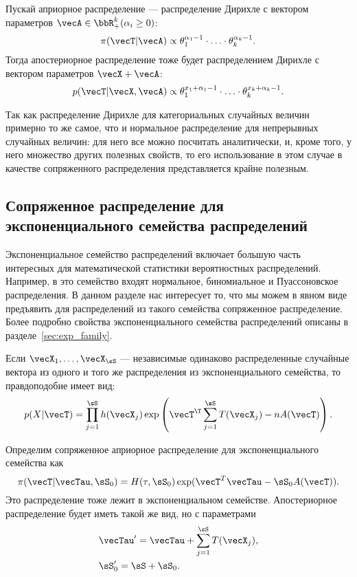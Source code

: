 Пускай априорное распределение --- распределение Дирихле с вектором параметров $\vecA \in \bbR_+^k (\alpha_i \geq 0)$:
\[
\pi(\vecT | \vecA) \propto \theta_1^{\alpha_1 - 1} \cdot \ldots \cdot \theta_k^{\alpha_k - 1}.
\]
Тогда апостериорное распределение тоже будет распределением Дирихле с вектором параметров $\vecX + \vecA$:
\[
p(\vecT | \vecX, \vecA) \propto \theta_1^{x_1 + \alpha_1 - 1} \cdot \ldots \cdot \theta_k^{x_k + \alpha_k - 1}.
\]

Так как распределение Дирихле для категориальных случайных величин примерно то же самое, что и нормальное распределение для непрерывных случайных величин: для него все можно посчитать аналитически, и, кроме того, у него множество других полезных свойств, то его использование в этом случае в 
качестве сопряженного распределения представляется крайне полезным.



\subsection{Сопряженное распределение для экспоненциального семейства распределений}
Экспоненциальное семейство распределений включает большую часть интересных для математической статистики вероятностных распределений.
Например, в это семейство входят нормальное, биномиальное и Пуассоновское распределения.
В данном разделе нас интересует то, что мы можем в явном виде предъявить для распределений из такого семейства сопряженное распределение.
Более подробно свойства экспоненциального семейства распределений описаны в разделе~\ref{sec:exp_family}.

Если $\vecX_1, \ldots, \vecX_\sS$ --- независимые одинаково распределенные случайные вектора из одного и того же распределения из экспоненциального семейства, то правдоподобие имеет вид:
\[
p(X | \vecT) = \prod_{j = 1}^{\sS} h(\vecX_j) \exp \left(\vecT^\T \sum_{j = 1}^\sS T(\vecX_j) - n A(\vecT) \right).
\]

Определим сопряженное априорное распределение для экспоненциального семейства как
\[
\pi(\vecT | \vecTau, \sS_0) = H(\tau, \sS_0) \exp(\vecT^T \vecTau  - \sS_0 A(\vecT)).
\]
Это распределение тоже лежит в экспоненциальном семействе.
Апостериорное распределение будет иметь такой же вид, 
но с параметрами 
\begin{align*}
&\vecTau' = \vecTau + \sum_{j = 1}^\sS T(\vecX_j), \\
&\sS'_0 = \sS + \sS_0.
\end{align*}



